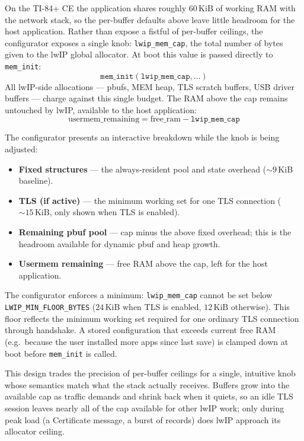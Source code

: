 \documentclass[titlepage]{report}
\begin{document}
			On the TI-84+ CE the application shares roughly $60\,\text{KiB}$ of working RAM with the network stack, so the per-buffer defaults above leave little headroom for the host application. Rather than expose a fistful of per-buffer ceilings, the configurator exposes a single knob: \texttt{lwip\_mem\_cap}, the total number of bytes given to the lwIP global allocator. At boot this value is passed directly to \texttt{mem\_init}:
			\[
				\texttt{mem\_init}(\texttt{lwip\_mem\_cap}, \ldots)
			\]
			All lwIP-side allocations --- pbufs, MEM heap, TLS scratch buffers, USB driver buffers --- charge against this single budget. The RAM above the cap remains untouched by lwIP, available to the host application:
			\[
				\text{usermem\_remaining} = \text{free\_ram} - \texttt{lwip\_mem\_cap}
			\]

			The configurator presents an interactive breakdown while the knob is being adjusted:
			\begin{itemize}
				\item \textbf{Fixed structures} --- the always-resident pool and state overhead (${\sim}9\,\text{KiB}$ baseline).
				\item \textbf{TLS (if active)} --- the minimum working set for one TLS connection (${\sim}15\,\text{KiB}$, only shown when TLS is enabled).
				\item \textbf{Remaining pbuf pool} --- cap minus the above fixed overhead; this is the headroom available for dynamic pbuf and heap growth.
				\item \textbf{Usermem remaining} --- free RAM above the cap, left for the host application.
			\end{itemize}

			The configurator enforces a minimum: \texttt{lwip\_mem\_cap} cannot be set below \texttt{LWIP\_MIN\_FLOOR\_BYTES} ($24\,\text{KiB}$ when TLS is enabled, $12\,\text{KiB}$ otherwise). This floor reflects the minimum working set required for one ordinary TLS connection through handshake. A stored configuration that exceeds current free RAM (e.g.\ because the user installed more apps since last save) is clamped down at boot before \texttt{mem\_init} is called.

			This design trades the precision of per-buffer ceilings for a single, intuitive knob whose semantics match what the stack actually receives. Buffers grow into the available cap as traffic demands and shrink back when it quiets, so an idle TLS session leaves nearly all of the cap available for other lwIP work; only during peak load (a Certificate message, a burst of records) does lwIP approach its allocator ceiling.
\end{document}
